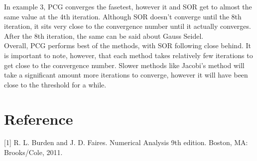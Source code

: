 \documentclass[11pt]{article}	%
\begin{document}
\noindent In example 3, PCG converges the fasetest, however it and SOR get to almost the same value at the 4th iteration. Although SOR doesn't converge until the 8th iteration, it sits very close to the convergence number until it actually converges. After the 8th iteration, the same can be said about Gauss Seidel. \\

\noindent Overall, PCG performs best of the methods, with SOR following close behind. It is important to note, however, that each method takes relatively few iterations to get close to the convergence number. Slower methods like Jacobi's method will take a significant amount more iterations to converge, however it will have been close to the threshold for a while.

\section{Reference}
[1] R. L. Burden and J. D. Faires. Numerical Analysis 9th edition. Boston, MA: Brooks/Cole, 2011.
\end{document}
